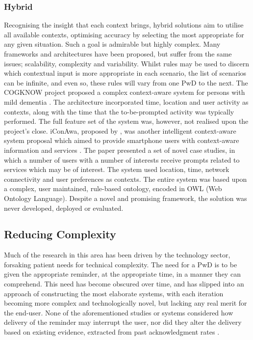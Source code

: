 \subsubsection{Hybrid}
Recognising the insight that each context brings, hybrid solutions aim to utilise all available contexts, optimising accuracy by selecting the most appropriate for any given situation. Such a goal is admirable but highly complex. Many frameworks and architectures have been proposed, but suffer from the same issues; scalability, complexity and variability. Whilst rules may be used to discern which contextual input is more appropriate in each scenario, the list of scenarios can be infinite, and even so, these rules will vary from one PwD to the next. The COGKNOW project  proposed a complex context-aware system for persons with mild dementia \cite{Zhang2008}. The architecture incorporated time, location and user activity as contexts, along with the time that the to-be-prompted activity was typically performed. The full feature set of the system was, however, not realised upon the project’s close. iConAwa, proposed by \citeauthor{Ylmaz2012}, was another intelligent context-aware system proposal which aimed to provide smartphone users with context-aware information and services \cite{Ylmaz2012}. The paper presented a set of novel case studies, in which a number of users with a number of interests receive prompts related to services which may be of interest. The system used location, time, network connectivity and user preferences as contexts.  The entire system was based upon a complex, user maintained, rule-based ontology, encoded in OWL (Web Ontology Language). Despite a novel and promising framework, the solution was never developed, deployed or evaluated.

\subsection{Reducing Complexity}
Much of the research in this area has been driven by the technology sector, forsaking patient needs for technical complexity.
The need for a PwD is to be given the appropriate reminder, at the appropriate time, in a manner they can comprehend. This need has become obscured over time, and has slipped into an approach of constructing the most elaborate systems, with each iteration becoming more complex and technologically novel, but lacking any real merit for the end-user. None of the aforementioned studies or systems considered how delivery of the reminder may interrupt the user, nor did they alter the delivery based on existing evidence, extracted from past acknowledgment rates \cite{Hartin2014-WAGER}.

